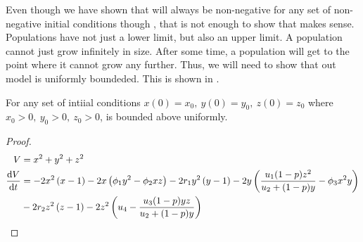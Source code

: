 Even though we have shown that  will always be non-negative for any set of non-negative initial conditions though , that is not enough to show that  makes sense. Populations have not just a lower limit, but also an upper limit. A population cannot just grow infinitely in size. After some time, a population will get to the point where it cannot grow any further. Thus, we will need to show that out model is uniformly boundeded. This is shown in .

\begin{theorem}\label{thm:bounded}
    For any set of intiial conditions $x(0) = x_0,\ y(0) = y_0,\ z(0) = z_0$ where $x_0 > 0,\ y_0 > 0,\ z_0 > 0$,  is bounded above uniformly.
\end{theorem}
\begin{proof}
    \begin{align*}
        V &= x^2+y^2+z^2\\
        \diff{V}{t} &= -2x^2\left(x-1\right)-2x\left(\phi_1 y^2-\phi_2xz\right)-2r_1y^2\left(y-1\right)-2y\left(\frac{{u_1(1-p)z^2}}{{u_2+(1-p)y}}-\phi_3x^2y\right)\\
        &-2r_2z^2\left(z-1\right)-2z^2\left(u_4-\frac{{u_3(1-p)yz}}{{u_2+(1-p)y}}\right)
    \end{align*}
\end{proof}